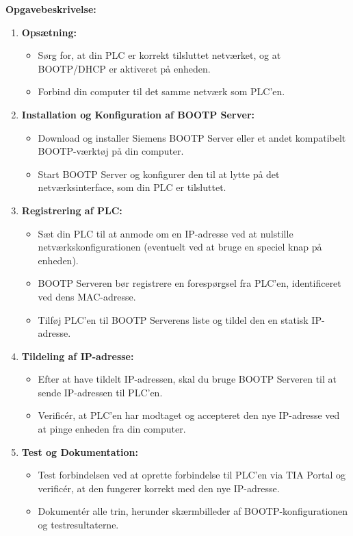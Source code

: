 \noindent\textbf{Opgavebeskrivelse:}
\begin{enumerate}
	\item \textbf{Opsætning:}
	\begin{itemize}
		\item Sørg for, at din PLC er korrekt tilsluttet netværket, og at BOOTP/DHCP er aktiveret på enheden.
		\item Forbind din computer til det samme netværk som PLC'en.
	\end{itemize}
	
	\item \textbf{Installation og Konfiguration af BOOTP Server:}
	\begin{itemize}
		\item Download og installer Siemens BOOTP Server eller et andet kompatibelt BOOTP-værktøj på din computer.
		\item Start BOOTP Server og konfigurer den til at lytte på det netværksinterface, som din PLC er tilsluttet.
	\end{itemize}
	
	\item \textbf{Registrering af PLC:}
	\begin{itemize}
		\item Sæt din PLC til at anmode om en IP-adresse ved at nulstille netværkskonfigurationen (eventuelt ved at bruge en speciel knap på enheden).
		\item BOOTP Serveren bør registrere en forespørgsel fra PLC'en, identificeret ved dens MAC-adresse.
		\item Tilføj PLC'en til BOOTP Serverens liste og tildel den en statisk IP-adresse.
	\end{itemize}
	
	\item \textbf{Tildeling af IP-adresse:}
	\begin{itemize}
		\item Efter at have tildelt IP-adressen, skal du bruge BOOTP Serveren til at sende IP-adressen til PLC'en.
		\item Verificér, at PLC'en har modtaget og accepteret den nye IP-adresse ved at pinge enheden fra din computer.
	\end{itemize}
	
	\item \textbf{Test og Dokumentation:}
	\begin{itemize}
		\item Test forbindelsen ved at oprette forbindelse til PLC'en via TIA Portal og verificér, at den fungerer korrekt med den nye IP-adresse.
		\item Dokumentér alle trin, herunder skærmbilleder af BOOTP-konfigurationen og testresultaterne.
	\end{itemize}
\end{enumerate}

